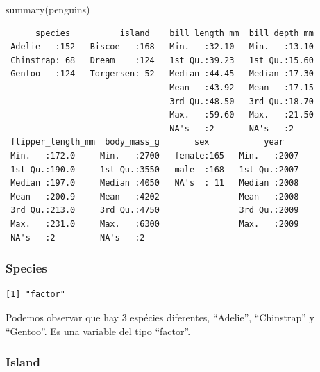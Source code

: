 \documentclass[
  letterpaper,
  DIV=11,
  numbers=noendperiod]{scrartcl}
\newenvironment{Shaded}{\begin{snugshade}}{\end{snugshade}}
\newcommand{\FunctionTok}[1]{\textcolor[rgb]{0.28,0.35,0.67}{#1}}
\newcommand{\NormalTok}[1]{\textcolor[rgb]{0.00,0.23,0.31}{#1}}
\newcommand{\SpecialCharTok}[1]{\textcolor[rgb]{0.37,0.37,0.37}{#1}}
\begin{document}
\begin{Shaded}
\begin{Highlighting}[]
\FunctionTok{summary}\NormalTok{(penguins)}
\end{Highlighting}
\end{Shaded}

\begin{verbatim}
      species          island    bill_length_mm  bill_depth_mm  
 Adelie   :152   Biscoe   :168   Min.   :32.10   Min.   :13.10  
 Chinstrap: 68   Dream    :124   1st Qu.:39.23   1st Qu.:15.60  
 Gentoo   :124   Torgersen: 52   Median :44.45   Median :17.30  
                                 Mean   :43.92   Mean   :17.15  
                                 3rd Qu.:48.50   3rd Qu.:18.70  
                                 Max.   :59.60   Max.   :21.50  
                                 NA's   :2       NA's   :2      
 flipper_length_mm  body_mass_g       sex           year     
 Min.   :172.0     Min.   :2700   female:165   Min.   :2007  
 1st Qu.:190.0     1st Qu.:3550   male  :168   1st Qu.:2007  
 Median :197.0     Median :4050   NA's  : 11   Median :2008  
 Mean   :200.9     Mean   :4202                Mean   :2008  
 3rd Qu.:213.0     3rd Qu.:4750                3rd Qu.:2009  
 Max.   :231.0     Max.   :6300                Max.   :2009  
 NA's   :2         NA's   :2                                 
\end{verbatim}

\hypertarget{species}{%
\subsubsection{Species}\label{species}}

\begin{Shaded}
\end{Shaded}

\begin{verbatim}
[1] "factor"
\end{verbatim}

Podemos observar que hay 3 espécies diferentes, ``Adelie'',
``Chinstrap'' y ``Gentoo''. Es una variable del tipo ``factor''.

\hypertarget{island}{%
\subsubsection{Island}\label{island}}
\end{document}
